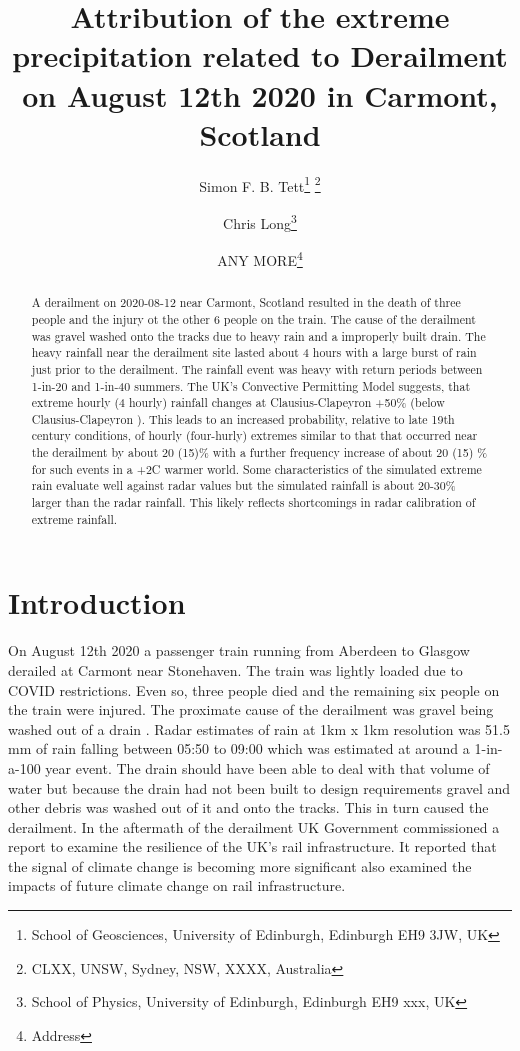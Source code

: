 \documentclass[11pt,a4paper]{article}
\title{Attribution of the  extreme precipitation related to Derailment  on August 12th 2020 in Carmont, Scotland}
\author{Simon F. B. Tett\thanks{School of Geosciences, University of Edinburgh, Edinburgh EH9 3JW, UK} \thanks{CLXX, UNSW, Sydney, NSW, XXXX, Australia}
	\and 
Chris Long\thanks{School of Physics, University of Edinburgh, Edinburgh EH9 xxx, UK}
\and 
ANY MORE\thanks{Address}}
\begin{document}
	
\maketitle

\graphicspath{{../figures/}}


\begin{abstract}
	A derailment on 2020-08-12 near Carmont, Scotland resulted in the death of three people and the injury ot the other 6 people on the train. The cause of the derailment was gravel washed onto the tracks due to heavy rain and a improperly built drain.  The heavy rainfall near the derailment site lasted about 4 hours with a large burst of  rain just prior to the derailment. The rainfall event was heavy with return  periods between 1-in-20  and 1-in-40 summers. 
	The UK's Convective Permitting Model suggests, that extreme hourly (4 hourly) rainfall changes at Clausius-Clapeyron +50\% (below Clausius-Clapeyron ). This leads to an increased probability, relative to late 19th century conditions,  of hourly (four-hurly) extremes similar to that that occurred near the derailment by about 20 (15)\% with a further frequency increase of about 20 (15)  \% for such events in a +2C warmer world. Some characteristics of the simulated extreme rain evaluate well against radar values but the  simulated rainfall is about 20-30\% larger than the radar rainfall. This likely reflects shortcomings in  radar  calibration of extreme rainfall. 
\end{abstract}



\section{Introduction}
\label{sect:Intro}

On August 12th 2020 a passenger train running from Aberdeen to Glasgow derailed at Carmont near Stonehaven. The train was lightly loaded due to COVID restrictions. Even so,  three people died and the remaining six people on the train  were injured. The proximate cause of the derailment was gravel being washed out of a drain \parencite{carmontReport2024}. Radar estimates of  rain at 1km x 1km resolution was 51.5 mm of rain falling between 05:50 to 09:00 which was estimated at around a 1-in-a-100 year event. The drain should have been able to deal with that volume of water but because the drain had not been built to design requirements gravel and other debris was washed out of it and onto the tracks. This in turn caused the derailment. In the aftermath of the derailment UK Government commissioned a report to examine the resilience of the UK's rail infrastructure\parencite{NR_DfT_2021}. It reported that the signal of climate change is becoming more significant  also examined the impacts of future climate change  on rail infrastructure.
\end{document}
